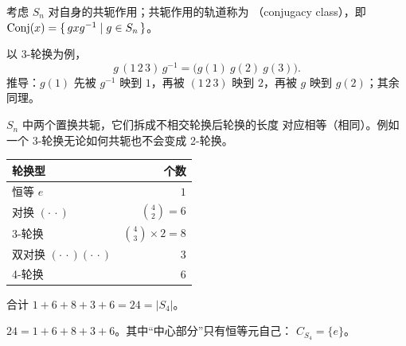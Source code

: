 考虑 $S_n$ 对自身的共轭作用；共轭作用的轨道称为
（conjugacy class），即 $\mathrm{Conj}(x) = \{\,gxg^{-1} \mid g\in S_n\,\}$。

以 3-轮换为例，
\[
  g\,(1\,2\,3)\,g^{-1} = \big(g(1)\ g(2)\ g(3)\big).
\]
推导：$g(1)$ 先被 $g^{-1}$ 映到 $1$，再被 $(1\,2\,3)$ 映到 $2$，再被 $g$
映到 $g(2)$；其余同理。

$S_n$ 中两个置换共轭，它们拆成不相交轮换后轮换的长度
对应相等（相同）。例如一个 3-轮换无论如何共轭也不会变成
2-轮换。

\begin{center}
\begin{tabularx}{0.62\linewidth}{Lr}
  \toprule
  轮换型 & 个数 \\
  \midrule
  恒等 $e$                          & $1$ \\
  对换 $(\cdot\,\cdot)$             & $\binom{4}{2} = 6$ \\
  3-轮换                            & $\binom{4}{3}\times 2 = 8$ \\
  双对换 $(\cdot\,\cdot)(\cdot\,\cdot)$ & $3$ \\
  4-轮换                            & $6$ \\
  \bottomrule
\end{tabularx}
\end{center}
合计 $1+6+8+3+6 = 24 = |S_4|$。

$24 = 1 + 6 + 8 + 3 + 6$。其中“中心部分”只有恒等元自己：
$C_{S_4} = \{e\}$。
